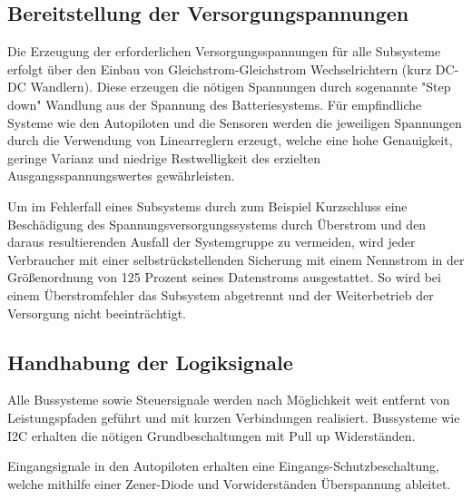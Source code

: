 \subsection{Bereitstellung der Versorgungspannungen}

Die Erzeugung der erforderlichen Versorgungsspannungen für alle Subsysteme erfolgt über den Einbau von Gleichstrom-Gleichstrom Wechselrichtern (kurz DC-DC Wandlern).
Diese erzeugen die nötigen Spannungen durch sogenannte "Step down"  Wandlung aus der Spannung des Batteriesystems.
Für empfindliche Systeme wie den Autopiloten und die Sensoren werden die jeweiligen Spannungen durch die Verwendung von Linearreglern erzeugt, welche eine hohe Genauigkeit, geringe Varianz und niedrige Restwelligkeit des erzielten Ausgangsspannungswertes gewährleisten.

Um im Fehlerfall eines Subsystems durch zum Beispiel Kurzschluss eine Beschädigung des Spannungsversorgungssystems durch Überstrom und den daraus resultierenden Ausfall der Systemgruppe zu vermeiden, wird jeder Verbraucher mit einer selbstrückstellenden Sicherung mit einem Nennstrom in der Größenordnung von 125 Prozent seines Datenstroms ausgestattet.
So wird bei einem Überstromfehler das Subsystem abgetrennt und der Weiterbetrieb der Versorgung nicht beeinträchtigt.


\subsection{Handhabung der Logiksignale}

Alle Bussysteme sowie Steuersignale werden nach Möglichkeit weit entfernt von Leistungspfaden geführt und mit kurzen Verbindungen realisiert.
Bussysteme wie I2C erhalten die nötigen Grundbeschaltungen mit Pull up Widerständen.

Eingangsignale in den Autopiloten erhalten eine Eingangs-Schutzbeschaltung, welche mithilfe einer Zener-Diode und Vorwiderständen Überspannung ableitet.